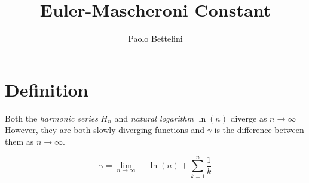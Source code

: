 \documentclass[a4paper]{article}
\title{Euler-Mascheroni Constant}
\author{Paolo Bettelini}
\date{}
\begin{document}
\maketitle
\tableofcontents
\pagebreak

\section{Definition}

Both the \textit{harmonic series} \(H_n\) and \textit{natural logarithm} \(\ln(n)\) diverge as \(n\to \infty\) \\
However, they are both slowly diverging functions and \(\gamma\) is the difference between them as \(n\to \infty\).

\[
    \gamma = \lim_{n\to\infty} -\ln(n)+\sum_{k=1}^{n}\frac{1}{k}
\]

\pagebreak
\end{document}
